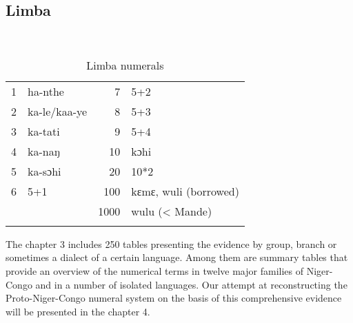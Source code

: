 \clearpage 
\subsection{Limba}%

~
\begin{table}[h]
\caption{\label{tab:3:250}Limba numerals}
 
\begin{tabularx}{\textwidth}{lQrQ}
\lsptoprule

1 & ha-nthe & 7 & 5+2\\
2 & ka-le/kaa-ye & 8 & 5+3\\
3 & ka-tati & 9 & 5+4\\
4 & ka-naŋ & 10 & kɔhi\\
5 & ka-sɔhi & 20 & 10*2\\
6 & 5+1 & 100 & kɛmɛ, wuli (borrowed)\\
&  & 1000 & wulu (< Mande)\\
\lspbottomrule
\end{tabularx}
\end{table}


  
The chapter 3 includes 250 tables presenting the evidence by group, branch or sometimes a dialect of a certain language. Among them are summary tables that provide an overview of the numerical terms in twelve major families of Niger-Congo and in a number of isolated languages. Our attempt at reconstructing the Proto-Niger-Congo numeral system on the basis of this comprehensive evidence will be presented in the chapter 4.

